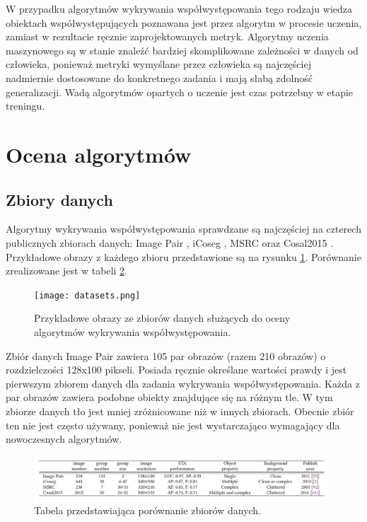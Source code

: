 \documentclass[a4paper,11pt, notitlepage, twosides, openany ]{report}
\begin{document}
	W przypadku algorytmów wykrywania współwystępowania tego rodzaju wiedza obiektach współwystępujących poznawana jest przez algorytm w procesie uczenia, zamiast w rezultacie ręcznie zaprojektowanych metryk. Algorytmy uczenia maszynowego są w stanie znaleźć bardziej skomplikowane zależności w danych od człowieka, ponieważ metryki wymyślane przez człowieka są najczęściej nadmiernie dostosowane do konkretnego zadania i mają słabą zdolność generalizacji. Wadą algorytmów opartych o uczenie jest czas potrzebny w etapie treningu.



	\section{Ocena algorytmów}
	\subsection{Zbiory danych}
	Algorytmy wykrywania współwystępowania sprawdzane są najczęściej na czterech publicznych zbiorach danych: Image Pair \cite{ImagePair}, iCoseg \cite{iCoseg}, MSRC \cite{MSRC} oraz Cosal2015 \cite{cosal2015}. Przykładowe obrazy z każdego zbioru przedstawione są na rysunku \ref{ds}. Porównanie zrealizowane jest w tabeli \ref{table}.

	\begin{figure}[h]
		\centering
		\texttt{[image: datasets.png]}
		\caption{Przykładowe obrazy ze zbiorów danych służących do oceny algorytmów wykrywania współwystępowania.}
		\label{ds}
	\end{figure}

	Zbiór danych Image Pair zawiera 105 par obrazów (razem 210 obrazów) o rozdzielczości 128x100 pikseli. Posiada ręcznie określane wartości prawdy i jest pierwszym zbiorem danych dla zadania wykrywania współwystępowania. Każda z par obrazów zawiera podobne obiekty znajdujące się na różnym tle. W tym zbiorze danych tło jest mniej zróżnicowane niż w innych zbiorach. Obecnie zbiór ten nie jest często używany, ponieważ nie jest wystarczająco wymagający dla nowoczesnych algorytmów.
	
	\begin{figure}[h]
		\centering
		\includegraphics[width=1\textwidth]{ds_comp.png}
		\caption{Tabela przedstawiająca porównanie zbiorów danych.}
		\label{table}
	\end{figure}
\end{document}
